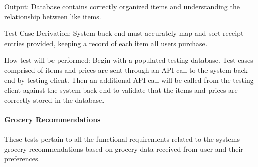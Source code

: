 \documentclass[12pt, titlepage]{article}
\begin{document}
\begin{enumerate}
Output: Database contains correctly organized items and understanding the relationship between like items.

Test Case Derivation: System back-end must accurately map and sort receipt entries provided, keeping a record of each item all users purchase.
          
How test will be performed: Begin with a populated testing database. Test cases comprised of items and prices are sent through an API call to the system back-end by testing client. Then an additional API call will be called from the testing client against the system back-end to validate that the items and prices are correctly stored in the database.

\end{enumerate}

\paragraph{Grocery Recommendations}

These tests pertain to all the functional requirements related to the systems grocery recommendations based on grocery data received from user and their preferences.
\end{document}
